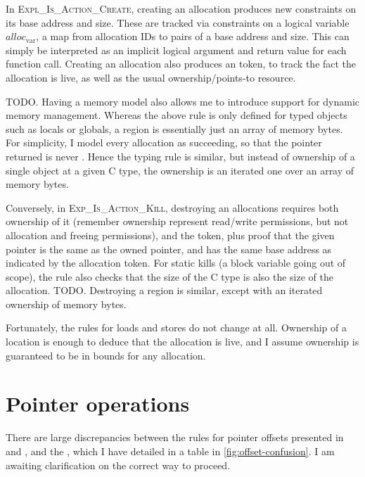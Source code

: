 In \textsc{Expl\_Is\_Action\_Create}, creating an allocation produces new
constraints on its base address and size. These are tracked via constraints on a
logical variable $\mathit{alloc}_\mathrm{var}$, a map from allocation IDs to
pairs of a base address and size. This can simply be interpreted as an implicit
logical argument and return value for each function call. Creating an
allocation also produces an  token, to track the fact the
allocation is live, as well as the usual ownership/points-to resource.

TODO\@. Having a memory model also allows me to introduce support for dynamic
memory management. Whereas the above rule is only defined for typed objects
such as locals or globals, a region is essentially just an array of memory
bytes. For simplicity, I model every allocation as succeeding, so that the
pointer returned is never . Hence the typing rule is similar,
but instead of ownership of a single object at a given C type, the ownership
is an iterated one over an array of memory bytes.

Conversely, in \textsc{Exp\_Is\_Action\_Kill}, destroying an allocations
requires both ownership of it (remember ownership represent read/write
permissions, but not allocation and freeing permissions), and the
 token, plus proof that the given pointer is the same as the
owned pointer, and has the same base address as indicated by the allocation
token. For static kills (a block variable going out of scope), the rule also
checks that the size of the C type is also the size of the allocation.
TODO\@. Destroying a region is similar, except with an iterated ownership
of memory bytes.

Fortunately, the rules for loads and stores do not change at all. Ownership of
a location is enough to deduce that the allocation is live, and I assume
ownership is guaranteed to be in bounds for any allocation.

\section{Pointer operations}

There are large discrepancies between the rules for pointer offsets presented
in  and , and
the , which I have detailed in a table in
\cref{fig:offset-confusion}. I am awaiting clarification on the correct way to
proceed.

